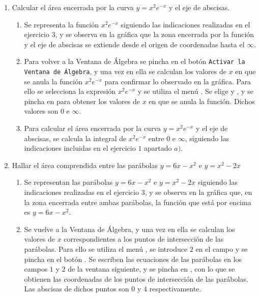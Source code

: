 \begin{enumerate}[leftmargin=*]
\item Calcular el área encerrada por la curva $y=x^{2}e^{-x}$ y el eje de abscisas.
\begin{indicacion}
{
\begin{enumerate}

\item Se representa la función $x^{2}e^{-x}$ siguiendo las indicaciones realizadas en el ejercicio
$3$, y se observa en la gráfica que la zona encerrada por la función
y el eje de abscisas se extiende desde el origen de coordenadas
hasta el $\infty$.

\item Para volver a la Ventana de Álgebra se pincha en el botón
\texttt{Activar la Ventana de Álgebra}, y una vez en ella se
calculan los valores de $x$ en que se anula la función $x^{2}e^{-x}$
para confirmar lo observado en la gráfica. Para ello se selecciona
la expresión $x^{2}e^{-x}$ y se utiliza el menú
. Se elige  y
, y se pincha en  para obtener
los valores de $x$ en que se anula la función. Dichos valores son
$0$ e $\infty$.

\item Para calcular el área encerrada por la curva $y=x^{2}e^{-x}$ y el eje de abscisas, se
calcula la integral de $x^{2}e^{-x}$ entre $0$ e $\infty$, siguiendo
las indicaciones incluidas en el ejercicio $1$ apartado $a)$.
\end{enumerate}
}
\end{indicacion}
\item Hallar el área comprendida entre las parábolas $y=6x-x^{2}$ e $y=x^{2}-2x$

\begin{indicacion}
{
\begin{enumerate}
\item Se representan las parábolas $y=6x-x^2$ e $y=x^{2}-2x$ siguiendo
las indicaciones realizadas en el ejercicio $3$, y se observa en la
gráfica que, en la zona encerrada entre ambas parábolas, la función
que está por encima es $y=6x-x^2$.

\item Se vuelve a la Ventana de Álgebra, y una vez en ella se
calculan los valores de $x$ correspondientes a los puntos de
intersección de las parábolas. Para ello se utiliza el menú
, se introduce $2$ en el campo
 y se pincha en el botón . Se escriben las
ecuaciones de las parábolas en los campos $1$ y $2$ de la ventana
siguiente, y se pincha en , con lo que se obtienen
las coordenadas de los puntos de intersección de las parábolas. Las
abscisas de dichos puntos son $0$ y $4$ respectivamente.


\end{enumerate}}
\end{indicacion}
\end{enumerate}
